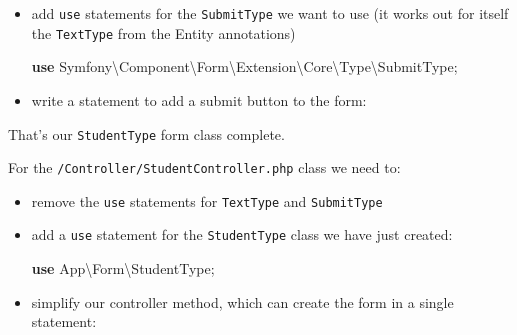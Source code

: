 \documentclass[a4paperpaper,openright]{book}
\newenvironment{Shaded}{}{}
\newcommand{\KeywordTok}[1]{\textcolor[rgb]{0.00,0.44,0.13}{\textbf{#1}}}
\newcommand{\NormalTok}[1]{#1}
\newcommand{\OtherTok}[1]{\textcolor[rgb]{0.00,0.44,0.13}{#1}}
\newcommand{\StringTok}[1]{\textcolor[rgb]{0.25,0.44,0.63}{#1}}
\begin{document}
\begin{itemize}
\item
  add \texttt{use} statements for the \texttt{SubmitType} we want to use
  (it works out for itself the \texttt{TextType} from the Entity
  annotations)

\begin{Shaded}
\begin{Highlighting}[]
     \KeywordTok{use}\NormalTok{ Symfony\textbackslash{}Component\textbackslash{}Form\textbackslash{}Extension\textbackslash{}Core\textbackslash{}Type\textbackslash{}SubmitType}\OtherTok{;}
\end{Highlighting}
\end{Shaded}
\item
  write a statement to add a submit button to the form:

\begin{Shaded}
\end{Shaded}
\end{itemize}

That's our \texttt{StudentType} form class complete.

For the \texttt{/Controller/StudentController.php} class we need to:

\begin{itemize}
\item
  remove the \texttt{use} statements for \texttt{TextType} and
  \texttt{SubmitType}
\item
  add a \texttt{use} statement for the \texttt{StudentType} class we
  have just created:

\begin{Shaded}
\begin{Highlighting}[]
     \KeywordTok{use}\NormalTok{ App\textbackslash{}Form\textbackslash{}StudentType}\OtherTok{;}
\end{Highlighting}
\end{Shaded}
\item
  simplify our controller method, which can create the form in a single
  statement:
\end{itemize}
\end{document}
